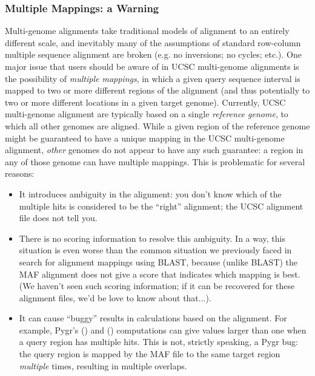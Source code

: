 \documentclass{howto}
\begin{document}
\subsubsection{Multiple Mappings: a Warning}
Multi-genome alignments take traditional models of alignment to an
entirely different scale, and inevitably many of the assumptions of
standard row-column multiple sequence alignment are broken (e.g. 
no inversions; no cycles; etc.).  One major issue that users should be
aware of in UCSC multi-genome alignments is the possibility of 
{\em multiple mappings}, in which a given query sequence interval is
mapped to two or more different regions of the alignment (and thus potentially
to two or more different locations in a given target genome).  Currently,
UCSC multi-genome alignment are typically based on a single 
{\em reference genome}, to which all other genomes are aligned.  While
a given region of the reference genome might be guaranteed to have
a unique mapping in the UCSC multi-genome alignment, {\em other} genomes
do not appear to have any such guarantee: a region in any of those genome
can have multiple mappings.  This is problematic for several reasons:
\begin{itemize}

\item It introduces ambiguity in the alignment: you don't know which of the
multiple hits is considered to be the ``right'' alignment; the UCSC alignment
file does not tell you.

\item There is no scoring information to resolve this ambiguity.  In a way,
this situation is even worse than the common situation we previously faced
in search for alignment mappings using BLAST, because (unlike BLAST) the 
MAF alignment does not give a score that indicates which mapping is best.
(We haven't seen such scoring information; if it can be recovered for these
alignment files, we'd be love to know about that...).

\item It can cause ``buggy'' results in calculations based on the alignment.
For example, Pygr's () and () computations
can give values larger than one when a query region has multiple hits.  This
is not, strictly speaking, a Pygr bug: the query region is mapped by the MAF
file to the same target region {\em multiple} times, resulting in multiple
overlaps.

\end{itemize}
\end{document}
